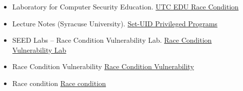 \documentclass{article}
\begin{document}
\begin{itemize}
  \item Laboratory for Computer Security Education. \href{https://www.utc.edu/sites/default/files/2021-04/race-condition.pdf}{UTC EDU Race Condition}
  
  \item Lecture Notes (Syracuse University). \href{https://web.ecs.syr.edu/~wedu/Teaching/cis643/LectureNotes_New/Set_UID.pdf}{Set-UID Privileged Programs}
  
  \item SEED Labs – Race Condition Vulnerability Lab. \href{https://seedsecuritylabs.org/Labs_16.04/PDF/Race_Condition_new.pdf}{Race Condition Vulnerability Lab}
  
  \item Race Condition Vulnerability \href{https://moodle1920.up.pt/pluginfile.php/132925/mod_resource/content/1/Race_Condition_Extra.pdf}{Race Condition Vulnerability}
  
  \item Race condition \href{https://en.wikipedia.org/wiki/Race_condition}{Race condition}
  
\end{itemize}
\end{document}

